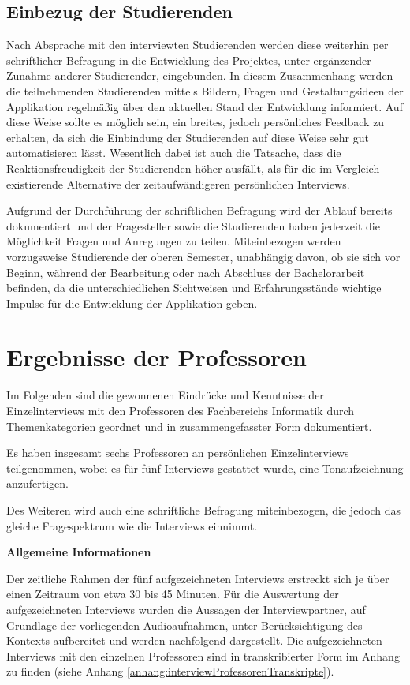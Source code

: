 \documentclass[bibliography=totoc,listof=totoc,BCOR=5mm,DIV=12,oneside]{scrbook}
\begin{document}
\subsection{Einbezug der Studierenden}
\par Nach Absprache mit den interviewten Studierenden werden diese weiterhin per schriftlicher Befragung in die Entwicklung des Projektes, unter ergänzender Zunahme anderer Studierender, eingebunden. In diesem Zusammenhang werden die teilnehmenden Studierenden mittels Bildern, Fragen und Gestaltungsideen der Applikation regelmäßig über den aktuellen Stand der Entwicklung informiert. Auf diese Weise sollte es möglich sein, ein breites, jedoch persönliches Feedback zu erhalten, da sich die Einbindung der Studierenden auf diese Weise sehr gut automatisieren lässt. Wesentlich dabei ist auch die Tatsache, dass die Reaktionsfreudigkeit der Studierenden höher ausfällt, als für die im Vergleich existierende Alternative der zeitaufwändigeren persönlichen Interviews.
\par \bigskip Aufgrund der Durchführung der schriftlichen Befragung wird der Ablauf bereits dokumentiert und der Fragesteller sowie die Studierenden haben jederzeit die Möglichkeit Fragen und Anregungen zu teilen. Miteinbezogen werden vorzugsweise Studierende der oberen Semester, unabhängig davon, ob sie sich vor Beginn, während der Bearbeitung oder nach Abschluss der Bachelorarbeit befinden, da die unterschiedlichen Sichtweisen und Erfahrungsstände wichtige Impulse für die Entwicklung der Applikation geben.

\newpage
\section{Ergebnisse der Professoren}
\par Im Folgenden sind die gewonnenen Eindrücke und Kenntnisse der Einzelinterviews mit den Professoren des Fachbereichs Informatik durch Themenkategorien geordnet und in zusammengefasster Form dokumentiert.
\par \bigskip Es haben insgesamt sechs Professoren an persönlichen Einzelinterviews teilgenommen, wobei es für fünf Interviews gestattet wurde, eine Tonaufzeichnung anzufertigen.
\par\bigskip Des Weiteren wird auch eine schriftliche Befragung miteinbezogen, die jedoch das gleiche Fragespektrum wie die Interviews einnimmt.

\par \bigskip \textbf{Allgemeine Informationen}
\par Der zeitliche Rahmen der fünf aufgezeichneten Interviews erstreckt sich je über einen Zeitraum von etwa 30 bis 45 Minuten. Für die Auswertung der aufgezeichneten Interviews wurden die Aussagen der Interviewpartner, auf Grundlage der vorliegenden Audioaufnahmen, unter Berücksichtigung des Kontexts aufbereitet und werden nachfolgend dargestellt. Die aufgezeichneten Interviews mit den einzelnen Professoren sind in transkribierter Form im Anhang zu finden (siehe Anhang \ref{anhang:interviewProfessorenTranskripte}).
\end{document}

